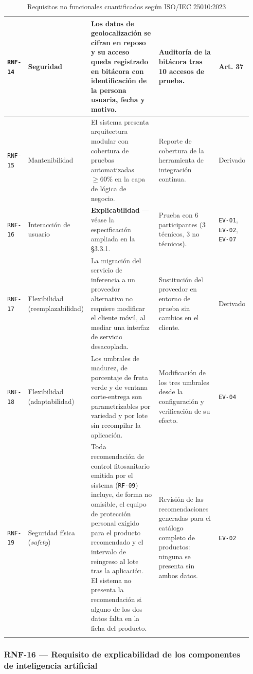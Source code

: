 \documentclass[11pt,a4paper]{article}
\newcommand{\id}[1]{\texttt{\begingroup\hyphenpenalty=10000\relax#1\endgroup}}
\renewcommand{\id}[1]{\texttt{#1}}
\begin{document}
{\begin{longtable}{|C{1.2cm}|L{2.4cm}|L{5.8cm}|L{3.1cm}|L{2.2cm}|}
\id{RNF-14} & Seguridad & Los datos de geolocalización se cifran en reposo y su acceso queda registrado en bitácora con identificación de la persona usuaria, fecha y motivo. & Auditoría de la bitácora tras 10 accesos de prueba. & \footnotesize \cite{lopdp} Art. 37 \\ \hline
\id{RNF-15} & Mantenibilidad & El sistema presenta arquitectura modular con cobertura de pruebas automatizadas $\geq 60\%$ en la capa de lógica de negocio. & Reporte de cobertura de la herramienta de integración continua. & \footnotesize Derivado \\ \hline
{}\id{RNF-16} & Interacción de usuario & \textbf{Explicabilidad} --- véase la especificación ampliada en la §3.3.1. & Prueba con 6 participantes (3 técnicos, 3 no técnicos). & \footnotesize \id{EV-01}, \id{EV-02}, \id{EV-07} \\ \hline
\id{RNF-17} & Flexibilidad \newline \footnotesize(reemplazabilidad) & La migración del servicio de inferencia a un proveedor alternativo no requiere modificar el cliente móvil, al mediar una interfaz de servicio desacoplada. & Sustitución del proveedor en entorno de prueba sin cambios en el cliente. & \footnotesize Derivado \\ \hline
\id{RNF-18} & Flexibilidad \newline \footnotesize(adaptabilidad) & Los umbrales de madurez, de porcentaje de fruta verde y de ventana corte-entrega son parametrizables por variedad y por lote sin recompilar la aplicación. & Modificación de los tres umbrales desde la configuración y verificación de su efecto. & \footnotesize \id{EV-04} \\ \hline
\id{RNF-19} & Seguridad física \newline \footnotesize(\emph{safety}) & Toda recomendación de control fitosanitario emitida por el sistema (\id{RF-09}) incluye, de forma no omisible, el equipo de protección personal exigido para el producto recomendado y el intervalo de reingreso al lote tras la aplicación. El sistema no presenta la recomendación si alguno de los dos datos falta en la ficha del producto. & Revisión de las recomendaciones generadas para el catálogo completo de productos: ninguna se presenta sin ambos datos. & \footnotesize \id{EV-02} \\ \hline
\caption{Requisitos no funcionales cuantificados según ISO/IEC 25010:2023}
\end{longtable}}

\subsubsection{RNF-16 --- Requisito de explicabilidad de los componentes de inteligencia artificial}
\end{document}
